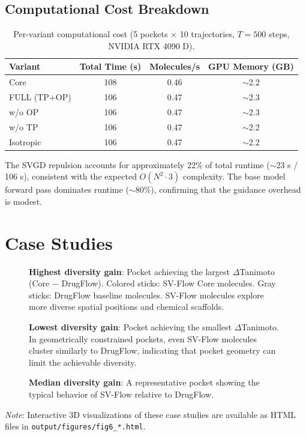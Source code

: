 \documentclass[a4paper,11pt]{article}
\begin{document}
\subsection{Computational Cost Breakdown}

\begin{table}[H]
\centering
\caption{Per-variant computational cost (5 pockets $\times$ 10 trajectories,
         $T = 500$ steps, NVIDIA RTX 4090 D).}
\label{tab:cost}
\begin{tabular}{l c c c}
\toprule
\textbf{Variant} & \textbf{Total Time (s)} & \textbf{Molecules/s} & \textbf{GPU Memory (GB)} \\
\midrule
Core          & 108 & 0.46 & $\sim$2.2 \\
FULL (TP+OP)  & 106 & 0.47 & $\sim$2.3 \\
w/o OP        & 106 & 0.47 & $\sim$2.3 \\
w/o TP        & 106 & 0.47 & $\sim$2.2 \\
Isotropic     & 106 & 0.47 & $\sim$2.2 \\
\bottomrule
\end{tabular}
\end{table}

The SVGD repulsion accounts for approximately 22\% of total runtime
($\sim$23 s / 106 s), consistent with the expected $O(N^2 \cdot 3)$ complexity.
The base model forward pass dominates runtime ($\sim$80\%), confirming that the
guidance overhead is modest.

\section{Case Studies}

\begin{figure}[H]
  \centering
  \textbf{Highest diversity gain}: Pocket achieving the largest
    $\Delta$Tanimoto (Core $-$ DrugFlow).  Colored sticks: SV-Flow Core
    molecules.  Gray sticks: DrugFlow baseline molecules.  SV-Flow molecules
    explore more diverse spatial positions and chemical scaffolds.
  \label{fig:case_high}
\end{figure}

\begin{figure}[H]
  \centering
  \textbf{Lowest diversity gain}: Pocket achieving the smallest
    $\Delta$Tanimoto.  In geometrically constrained pockets, even SV-Flow
    molecules cluster similarly to DrugFlow, indicating that pocket geometry can
    limit the achievable diversity.
  \label{fig:case_low}
\end{figure}

\begin{figure}[H]
  \centering
  \textbf{Median diversity gain}: A representative pocket showing the typical
    behavior of SV-Flow relative to DrugFlow.
  \label{fig:case_median}
\end{figure}

\noindent\textit{Note}: Interactive 3D visualizations of these case studies are
available as HTML files in \texttt{output/figures/fig6\_*.html}.
\end{document}
